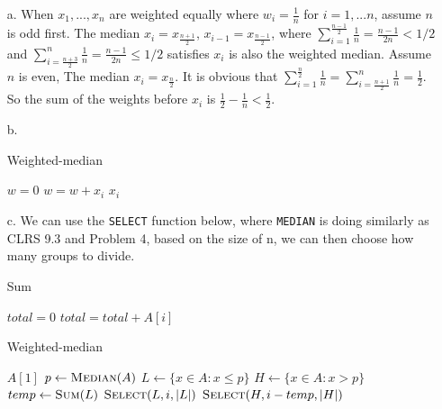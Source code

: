 \documentclass{article}
\begin{document}
\begin{enumerate}
    \item[a.] When $x_1,...,x_n$ are weighted equally where $w_i=\frac{1}{n}$ for $i=1,...n$, assume $n$ is odd first. The median $x_i=x_{\frac{n+1}{2}}$, $x_{i-1}=x_{\frac{n-1}{2}}$, where $\sum_{i=1}^{\frac{n-1}{2}} \frac{1}{n} = \frac{n-1}{2n} < 1/2$ and $\sum_{i=\frac{n+3}{2}}^{n} \frac{1}{n} = \frac{n-1}{2n} \leq 1/2$ satisfies $x_i$ is also the weighted median. Assume $n$ is even, The median $x_i=x_{\frac{n}{2}}$. It is obvious that $\sum_{i=1}^{\frac{n}{2}} \frac{1}{n}=\sum_{i=\frac{n+1}{2}}^{n} \frac{1}{n}=\frac{1}{2}$. So the sum of the weights before $x_i$ is $\frac{1}{2}-\frac{1}{n} < \frac{1}{2}$.
    \item[b.]
    \begin{algorithm}
    \caption{Weighted-median}
    \begin{algorithmic}[1]
        \State $w=0$
        \State {} 
         
            \State $w = w + x_i$
                \State \Return $x_i$
            \EndIf
        \EndFor
    \EndFunction {}
\end{algorithmic}
\end{algorithm}
    \item[c.]
    We can use the \texttt{SELECT} function below, where \texttt{MEDIAN} is doing similarly as CLRS 9.3 and Problem 4, based on the size of n, we can then choose how many groups to divide.
    \begin{algorithm}
    \caption{Sum}
    \begin{algorithmic}[1]
    \State $total = 0$
        \State $total=total+A[i]$
    \EndFor
    \EndFunction {}
    \end{algorithmic}
    \end{algorithm} 
    
    \begin{algorithm}
    \caption{Weighted-median}
    \begin{algorithmic}[1]
        \State \Return $A[1]$
    \EndIf
    \State $p \gets \Call{Median}{A}$
    \State $L \gets \{x \in A : x \leq p\}$
    \State $H \gets \{x \in A : x > p\}$
    \State $temp \gets \Call{Sum}{L}$
        \State \Return $\Call{Select}{L, i, \lvert L \rvert}$
    \Else
        \State \Return $\Call{Select}{H, i - temp, \lvert H \rvert}$
    \EndIf
    \EndFunction {}
    \end{algorithmic}
    \end{algorithm}
    

\end{enumerate}
\end{document}
